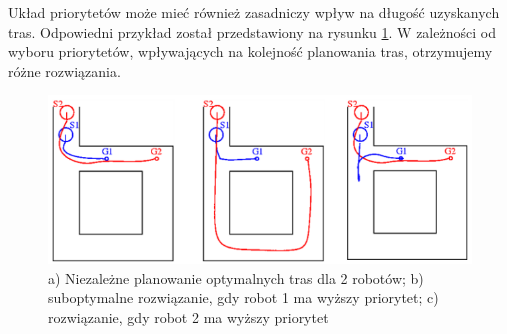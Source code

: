 Układ priorytetów może mieć również zasadniczy wpływ na długość uzyskanych tras. Odpowiedni przykład został przedstawiony na rysunku \ref{fig:image_article1_ppt6}. W zależności od wyboru priorytetów, wpływających na kolejność planowania tras, otrzymujemy różne rozwiązania.
\begin{figure}[H]
	\centering
	\includegraphics[width=13cm]{img/article1/ppt6}
	\caption{a) Niezależne planowanie optymalnych tras dla 2 robotów; b) suboptymalne rozwiązanie, gdy robot 1 ma wyższy priorytet; c) rozwiązanie, gdy robot 2 ma wyższy priorytet}
	\label{fig:image_article1_ppt6}
\end{figure}
